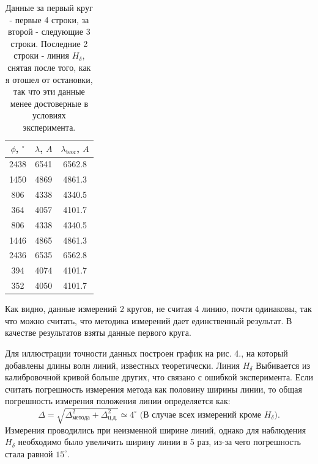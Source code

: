 \documentclass[a4paper, 14pt]{extarticle}%
\newcommand\ECaption[1]{%
     \captionsetup{font=footnotesize}%
     \caption{#1}}
\begin{document}
\begin{table}[h]
\begin{center}
\begin{tabular}{|c|c|c|}
\hline
\rowcolor[HTML]{9698ED} 
$\phi$, $^{\circ}$ & $\lambda$, $A$ & $\lambda_{\text{teor}}$, $A$ \\ \hline
2438               & 6541           & 6562.8                       \\ \hline
\rowcolor[HTML]{9698ED} 
1450               & 4869           & 4861.3                       \\ \hline
806                & 4338           & 4340.5                       \\ \hline
\rowcolor[HTML]{9698ED} 
364                & 4057           & 4101.7                       \\ \hline
\rowcolor[HTML]{DAE8FC} 
806                & 4338           & 4340.5                       \\ \hline
\rowcolor[HTML]{9698ED} 
1446               & 4865           & 4861.3                       \\ \hline
\rowcolor[HTML]{DAE8FC} 
2436               & 6535           & 6562.8                       \\ \hline
\rowcolor[HTML]{C0C0C0} 
394                & 4074           & 4101.7                       \\ \hline
\rowcolor[HTML]{C0C0C0} 
352                & 4050           & 4101.7                       \\ \hline
\end{tabular}
\ECaption{ Данные за первый круг - первые 4 строки, за второй - следующие 3 строки. Последние 2 строки - линия $H_{\delta}$, снятая после того, как я отошел от остановки, так что эти данные менее достоверные в условиях эксперимента.}
\end{center}
\end{table}

Как видно, данные измерений 2 кругов, не считая 4 линию, почти одинаковы, так что можно считать, что методика измерений дает единственный результат.
В качестве результатов взяты данные первого круга.

Для иллюстрации точности данных построен график на рис. 4., на который добавлены длины волн линий, известных теоретически. Линия $H_{\delta}$ Выбивается из калибровочной кривой больше других, что связано с ошибкой эксперимента. Если считать погрешность измерения метода как половину ширины линии, то общая погрешность измерения положения линии определяется как:
\[\Delta = \sqrt{\Delta_{\text{метода}}^2 + \Delta_{\text{ц.д.}}^2 } \simeq 4^{\circ} \text{ (В случае всех измерений кроме } H_{\delta}).\] 
Измерения проводились при неизменной ширине линий, однако для наблюдения $H_{\delta}$ необходимо было увеличить ширину линии в 5 раз, из-за чего погрешность стала равной $15^{\circ}$. 
\end{document}
